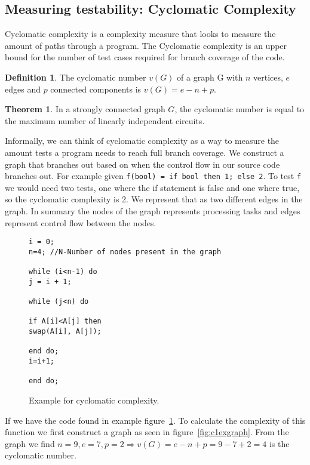 \documentclass[12pt]{article}
\theoremstyle{definition}
\newtheorem*{definition}{Definition}
\theoremstyle{theorem}
\newtheorem*{theorem}{Theorem}
\begin{document}
\subsection{Measuring testability: Cyclomatic Complexity}\label{cyclomaticcomplexity}

Cyclomatic complexity is a complexity measure that looks to measure the amount
of paths through a program. The Cyclomatic complexity is an upper bound for the
number of test cases required for branch coverage of the code. 

\theoremstyle{definition}
\begin{definition}
The cyclomatic number $v(G)$ of a graph G with $n$ vertices, $e$ edges and $p$
connected components is $v(G) = e - n + p$.
\end{definition}

\begin{theorem}
In a strongly connected graph $G$, the cyclomatic number is equal to the
maximum number of linearly independent circuits.~\cite{McCabe}
\end{theorem}

Informally, we can think of cyclomatic complexity as a way to measure the amount
tests a program needs to reach full branch coverage. We construct a graph that
branches out based on when the control flow in our source code branches out. For
example given \texttt{f(bool) = if bool then 1; else 2}. To test
\texttt{f} we would need two tests, one where the if statement is false and one
where true, so the cyclomatic complexity is 2. We represent that as two
different edges in the graph. In summary the nodes of the graph represents
processing tasks and edges represent control flow between the nodes. 

\begin{figure}[H]
    \begin{lstlisting}
i = 0;
n=4; //N-Number of nodes present in the graph

while (i<n-1) do
j = i + 1;

while (j<n) do

if A[i]<A[j] then
swap(A[i], A[j]);

end do;
i=i+1;

end do; 
    \end{lstlisting}
    \caption{Example for cyclomatic complexity.}\label{c1excode}
\end{figure}

If we have the code found in example figure~\ref{c1excode}. To calculate the
complexity of this function we first construct a graph as seen in
figure~\ref{fig:c1exgraph}. From the graph we find $n=9, e=7, p=2\Rightarrow
v(G)=e-n+p=9-7+2=4$ is the cyclomatic number.
\end{document}
